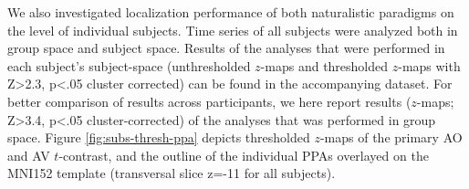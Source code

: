 \documentclass[english]{article}
\begin{document}
We also investigated localization performance of both naturalistic paradigms on
the level of individual subjects.
Time series of all subjects were analyzed both in group space and subject space.
Results of the analyses that were performed in each subject's subject-space
(unthresholded $z$-maps and thresholded $z$-maps with Z>2.3, p<.05 cluster
corrected) can be found in the accompanying dataset.
For better comparison of results across participants, we here report results
($z$-maps; Z>3.4, p<.05 cluster-corrected) of the analyses that was performed in
group space.
Figure \ref{fig:subs-thresh-ppa} depicts thresholded $z$-maps of the primary AO
and AV $t$-contrast, and the outline of the individual PPAs
\citep{sengupta2016extension} overlayed on the MNI152 template (transversal slice z=-11 for all subjects).

\end{document}
